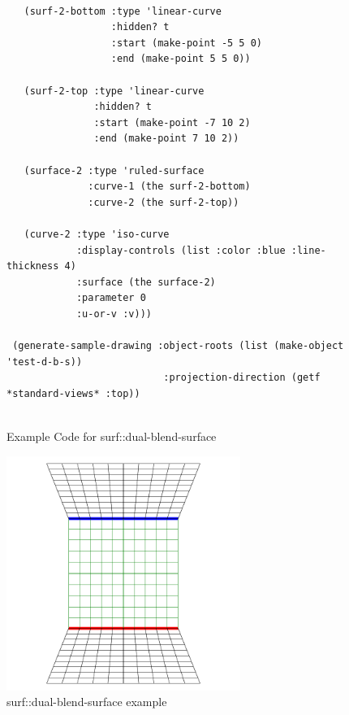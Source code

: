 \documentclass [11pt]{book}
\begin{document}
\begin{itemize}
\begin{figure}
\begin{lrbox}{\boxedverb}
\begin{minipage}{\linewidth}
{\begin{verbatim}
    
   (surf-2-bottom :type 'linear-curve
                  :hidden? t
                  :start (make-point -5 5 0)
                  :end (make-point 5 5 0))
    
   (surf-2-top :type 'linear-curve
               :hidden? t
               :start (make-point -7 10 2)
               :end (make-point 7 10 2))
    
   (surface-2 :type 'ruled-surface
              :curve-1 (the surf-2-bottom)
              :curve-2 (the surf-2-top))
    
   (curve-2 :type 'iso-curve
            :display-controls (list :color :blue :line-thickness 4)
            :surface (the surface-2)
            :parameter 0
            :u-or-v :v)))

 (generate-sample-drawing :object-roots (list (make-object 'test-d-b-s))
                           :projection-direction (getf *standard-views* :top))
 
\end{verbatim}}
\end{minipage}
\end{lrbox}
\fbox{\usebox{\boxedverb}}

\caption{Example Code for surf::dual-blend-surface}

\label{fig:example-code-surf::dual-blend-surface}

\end{figure}

\begin{figure}
\begin{center}
\includegraphics[width=3in,height=3in]{../images/example-surf::dual-blend-surface.pdf}
\end{center}

\caption{surf::dual-blend-surface example}

\label{fig:surf::dual-blend-surface}


\end{figure}
\end{itemize}
\end{document}
